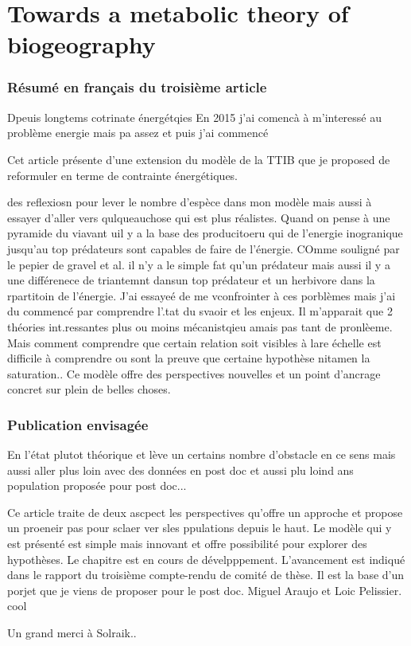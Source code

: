\chapter{Towards a metabolic theory of biogeography}
\label{chap4}


\subsection{Résumé en français du troisième article}

Dpeuis longtems cotrinate énergétqies
En 2015 j'ai comencà à m'interessé au problème energie mais pa assez et puis j'ai commencé

Cet article présente d'une extension du modèle de la TTIB \citep{Gravel2011}
que je proposed de reformuler en terme de contrainte énergétiques.


des reflexiosn pour lever le nombre d'espèce dans mon modèle mais aussi à essayer d'aller vers qulqueauchose qui est plus réalistes.
Quand on pense à une pyramide du viavant uil y a la base des producitoeru qui de l'energie inogranique jusqu'au top prédateurs sont capables de faire de l'énergie.
COmme souligné par le pepier de gravel et al. il n'y a le simple fat qu'un prédateur mais aussi il y a une différenece de triantemnt dansun top prédateur et un herbivore dans la rpartitoin de l'énergie. J'ai essayeé de me vconfrointer à ces porblèmes mais j'ai du commencé par comprendre l'.tat du svaoir et les enjeux. Il m'apparait que 2 théories int.ressantes plus ou moins mécanistqieu amais pas tant de pronlèeme. Mais comment comprendre que certain relation soit visibles à lare échelle est difficile à comprendre ou sont la preuve que certaine hypothèse nitamen la saturation..
Ce modèle offre des perspectives nouvelles et un point d'ancrage concret sur plein de belles choses.



\subsection{Publication envisagée}

En l'état plutot théorique et lève un certains nombre d'obstacle en ce sens
mais aussi aller plus loin avec des données en post doc et aussi plu loind ans population
proposée pour post doc... 

Ce article traite de deux ascpect les perspectives qu'offre un approche et propose un proeneir pas pour sclaer ver sles ppulations depuis le haut.
Le modèle qui y est présenté est simple mais innovant et offre possibilité pour explorer des hypothèses.
Le chapitre est en cours de dévelpppement. L'avancement est indiqué dans le rapport du troisième compte-rendu de comité de thèse.
Il est la base d'un porjet que je viens de proposer pour le post doc.
Miguel Araujo et Loic Pelissier. cool

Un grand merci à Solraik..
